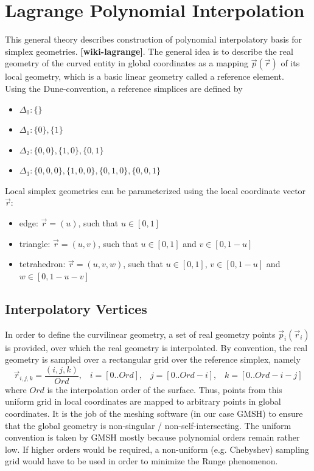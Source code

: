\section{Lagrange Polynomial Interpolation}

This general theory describes construction of polynomial interpolatory basis for simplex geometries. \textbf{[wiki-lagrange]}. The general idea is to describe the real geometry of the curved entity in global coordinates as a mapping $\vec{p}(\vec{r})$ of its local geometry, which is a basic linear geometry called a reference element. \\

\noindent
Using the Dune-convention, a reference simplices are defined by
\begin{itemize}
	\item $\Delta_0 : \{ \}$
	\item $\Delta_1 : \{ 0\}, \{ 1\}$
	\item $\Delta_2 : \{ 0, 0 \}, \{ 1, 0 \}, \{ 0, 1 \}$
	\item $\Delta_3 : \{ 0, 0, 0 \}, \{ 1, 0, 0 \}, \{ 0, 1, 0 \}, \{ 0, 0, 1 \}$
\end{itemize}

\noindent
Local simplex geometries can be parameterized using the local coordinate vector $\vec{r}$:
\begin{itemize}
	\item edge:			$\vec{r}=(u)$,		such that $u \in [0,1]$
	\item triangle: 	$\vec{r}=(u,v)$,	such that $u \in [0,1]$ and $v \in [0, 1-u]$
	\item tetrahedron:	$\vec{r}=(u,v,w)$,	such that $u \in [0,1]$, $v \in [0, 1-u]$ and $w \in [0, 1-u-v]$ 
\end{itemize}

\subsection{Interpolatory Vertices}

\noindent
In order to define the curvilinear geometry, a set of real geometry points $\vec{p}_i(\vec{r}_i)$ is provided, over which the real geometry is interpolated. By convention, the real geometry is sampled over a rectangular grid over the reference simplex, namely
\[\vec{r}_{i,j,k} = \frac{(i,j,k)}{Ord}, \;\;\; i=[0..Ord], \;\;\; j=[0..Ord-i], \;\;\; k=[0..Ord-i-j]\]
where $Ord$ is the interpolation order of the surface. Thus, points from this uniform grid in local coordinates are mapped to arbitrary points in global coordinates. It is the job of the meshing software (in our case GMSH) to ensure that the global geometry is non-singular / non-self-intersecting. The uniform convention is taken by GMSH mostly because polynomial orders remain rather low. If higher orders would be required, a non-uniform (e.g. Chebyshev) sampling grid would have to be used in order to minimize the Runge phenomenon. \\


